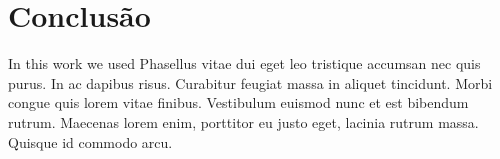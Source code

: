 \newpage
\chapter{Conclusão}

In this work we used Phasellus vitae dui eget leo tristique accumsan
nec quis purus. In ac dapibus risus. Curabitur feugiat massa in
aliquet tincidunt. Morbi congue quis lorem vitae finibus. Vestibulum
euismod nunc et est bibendum rutrum. Maecenas lorem enim, porttitor eu
justo eget, lacinia rutrum massa. Quisque id commodo arcu. 


\newpage